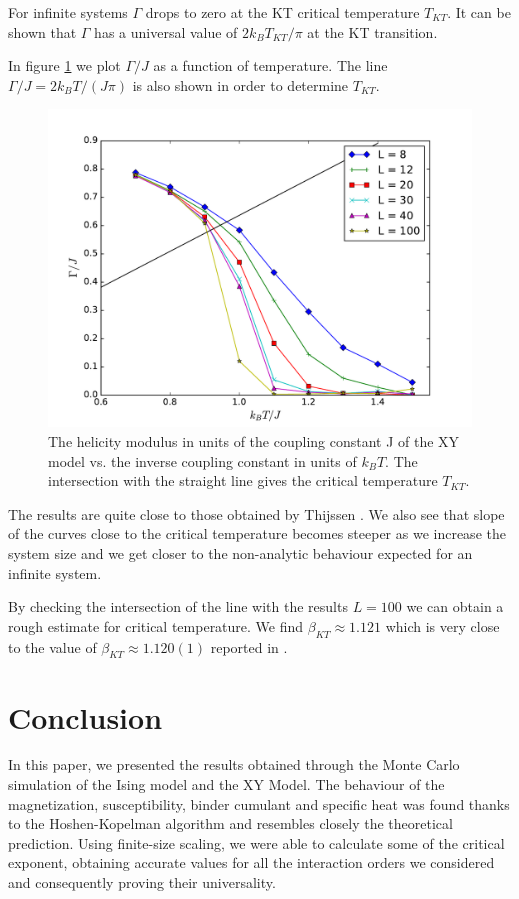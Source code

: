 \documentclass[twoside]{article}
\begin{document}
\begin{multicols}{2}
For infinite systems $\Gamma$ drops to zero at the KT critical temperature $T_{KT}$. It can be shown \cite{thijssen} that  $\Gamma$ has a universal value of $2k_B T_{KT}/\pi$ at the KT transition.

In figure \ref{helicity_modulus_fig} we plot $\Gamma/J$ as a function of temperature. The line $ \Gamma/J = 2k_B T/(J \pi)$ is also shown in order to determine $T_{KT}$.

\begin{figure}[H]
\centering
\includegraphics[scale=0.4]{images/helicity_modulus.pdf}
\caption{The helicity modulus in units of the coupling constant J of the XY model vs. the inverse coupling constant in units of $k_B T$. The intersection with the straight line gives the critical temperature $T_{KT}$.}
\label{helicity_modulus_fig}
\end{figure}

The results are quite close to those obtained by Thijssen \cite{thijssen}. We also see that slope of the curves close to the critical temperature becomes steeper as we increase the system size and we get closer to the non-analytic behaviour expected for an infinite system.

By checking the intersection of the line with the results $L=100$ we can obtain a rough estimate for critical temperature. We find $\beta_{KT} \approx 1.121$ which is very close to the value of $\beta_{KT} \approx 1.120(1)$ reported in \cite{dukovski}.

\section{Conclusion}
In this paper, we presented the results obtained through the Monte Carlo simulation of the Ising model and the XY Model.
The behaviour of the magnetization, susceptibility, binder cumulant and specific heat was found thanks to the Hoshen-Kopelman algorithm and resembles closely the theoretical prediction. Using finite-size scaling, we were able to calculate some of the critical exponent, obtaining accurate values for all the interaction orders we considered and consequently proving their universality.
\begin{appendices}

\end{appendices}
\end{multicols}
\end{document}

